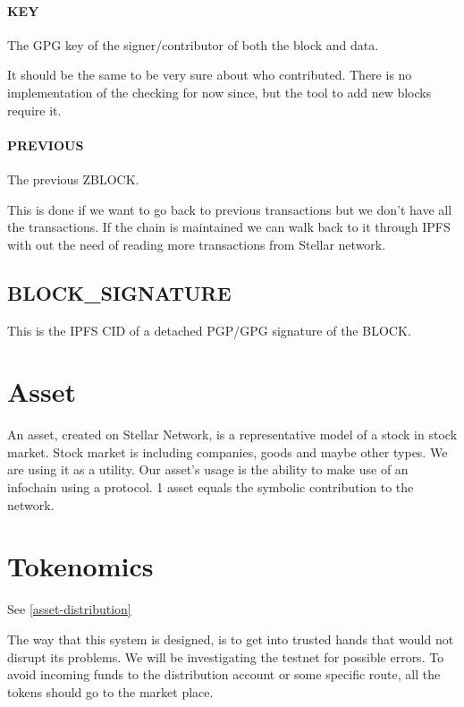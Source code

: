 \documentclass[10pt,a4paper]{paper}
\begin{document}
	\paragraph{KEY}\label{key}
	The GPG key of the signer/contributor of both the block and data.
	 
	 
	It should be the same to be very sure about who contributed. There is no implementation of the checking for now since, but the tool to add new blocks require it.
	 
	\paragraph{PREVIOUS}\label{previous}
	The previous ZBLOCK.
	 
	 
	This is done if we want to go back to previous transactions but we don't have all the transactions. If the chain is maintained we can walk back to it through IPFS with out the need of reading more transactions from Stellar network.
	
	
	\subsection{BLOCK\_SIGNATURE}\label{block-signature}
	This is the IPFS CID of a detached PGP/GPG signature of the BLOCK.
	
	
	\section{Asset}\label{asset}
	An asset, created on Stellar Network, is a representative model of a stock in stock market. Stock market is including companies, goods and maybe other types. We are using it as a utility. Our asset's usage is the ability to make use of an infochain using a protocol. 1 asset equals the symbolic contribution to the network.

	\section{Tokenomics}\label{tokenomics}
	See \ref{asset-distribution}
	
	The way that this system is designed, is to get into trusted hands that would not disrupt its problems. We will be investigating the testnet for possible errors. To avoid incoming funds to the distribution account or some specific route, all the tokens should go to the market place.
\end{document}
